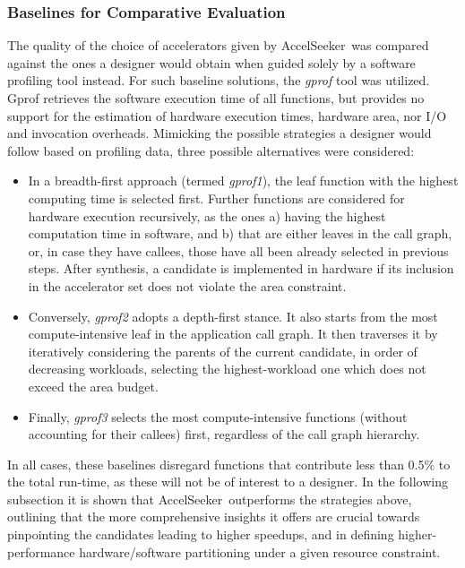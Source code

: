 \documentclass[]{usiinfthesis}
\newcommand{\aseeker}{{AccelSeeker}}
\begin{document}
%
%
%
\subsubsection{Baselines for Comparative Evaluation} 
The quality of the choice of accelerators given by \aseeker\ was compared against 
the ones a designer would obtain when guided solely by a software profiling tool
instead. For such baseline solutions, the \emph{gprof} tool \cite{GrahamJun82} 
was utilized. Gprof retrieves the software execution time of all
functions, but provides no support for the estimation of hardware
execution times, hardware area, nor I/O and invocation
overheads. Mimicking the possible strategies a designer would follow
based on profiling data, three possible alternatives were considered:

\begin{itemize}
\item{} In a breadth-first approach (termed \emph{gprof1}), the leaf
  function with the highest computing time is selected first. Further
  functions are considered for hardware execution recursively, as the
  ones a) having the highest computation time in software, and b) that
  are either leaves in the call graph, or, in case they have callees,
  those have all been already selected in previous steps. After
  synthesis, a candidate is implemented in hardware if its inclusion
  in the accelerator set does not violate the area constraint.
\item{} Conversely, \emph{gprof2} adopts a depth-first stance. It also starts from
the most compute-intensive leaf in the application call graph. It then traverses it
by iteratively considering the parents of the current candidate, in order
of decreasing workloads, selecting the highest-workload one which does 
not exceed the area budget. 
\item{} Finally, \emph{gprof3} selects the most compute-intensive functions (without
accounting for their callees) first, regardless of the call graph hierarchy. 
\end{itemize}

In all cases, these baselines disregard functions that contribute less
than 0.5\% to the total run-time, as these will not be of interest to
a designer. In the following subsection it is shown that \aseeker\ 
outperforms the strategies above, outlining that the more
comprehensive insights it offers are crucial towards pinpointing the
candidates leading to higher speedups, and in defining
higher-performance hardware/software partitioning under a given resource
constraint.
\end{document}
